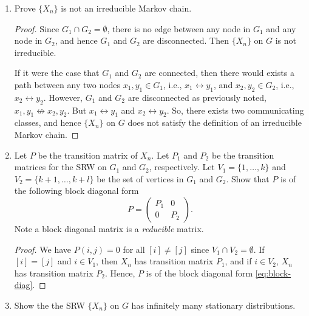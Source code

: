 \documentclass[oneside,reqno]{amsart}
\theoremstyle{definition}
\begin{document}
\begin{enumerate}
\item
Prove $\{X_n\}$ is not an irreducible Markov chain. 

\begin{proof}
Since $G_1 \cap G_2 = \emptyset$, there is no edge between any node in $G_1$ and any node in $G_2$, and hence $G_1$ and $G_2$ are disconnected. Then $\{X_n\}$ on $G$ is not irreducible. 
\par
If it were the case that $G_1$ and $G_2$ are connected, then there would exists a path between any two nodes $x_1, y_1 \in G_1$, i.e., $x_1 \leftrightarrow y_1$, and $x_2, y_2 \in G_2$, i.e., $x_2 \leftrightarrow y_2$. However, $G_1$ and $G_2$ are disconnected as previously noted, $x_1,y_1 \not\leftrightarrow x_2,y_2$. But $x_1 \leftrightarrow y_1$ and $x_2 \leftrightarrow y_2$. So, there exists two communicating classes, and hence $\{X_n\}$ on $G$ does not satisfy the definition of an irreducible Markov chain.
\end{proof}

\item
Let $P$ be the transition matrix of $X_n$. Let $P_1$ and $P_2$ be the transition matrices for the SRW on $G_1$ and $G_2$, respectively. Let $V_1 =\{1,\dotsc,k\}$ and $V_2 =\{k+1,\dotsc,k+l\}$ be the set of vertices in $G_1$ and $G_2$. Show that $P$ is of the following block diagonal form 
\begin{equation}\label{eq:block-diag}
	P = \begin{pmatrix}
		P_1 & 0 \\
		0 & P_2 
	\end{pmatrix}.
\end{equation}
Note a block diagonal matrix is a \emph{reducible} matrix.

\begin{proof}
We have $P(i,j) = 0$ for all $[i] \neq [j]$ since $V_1 \cap V_2 = \emptyset$. If $[i] = [j]$ and $i \in V_1$, then $X_n$ has transition matrix $P_1$, and if $i \in V_2$, $X_n$ has transition matrix $P_2$. Hence, $P$ is of the block diagonal form \eqref{eq:block-diag}.
\end{proof}


\item
Show the the SRW $\{X_n\}$ on $G$ has infinitely many stationary distributions. 


\end{enumerate}
\end{document}
